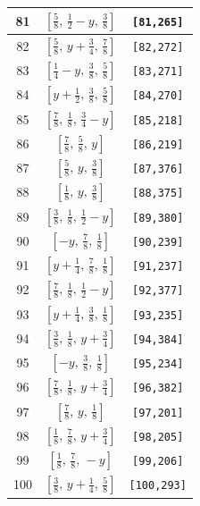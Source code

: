 \documentclass[fleqn,8pt]{jsarticle}
\begin{document}
\begin{longtable}{ccc}
81 & $\left[ \frac{5}{8},\, \frac{1}{2} - y,\, \frac{3}{8} \right]$ & {\tt [81,265]} \\ \hline
82 & $\left[ \frac{5}{8},\, y + \frac{3}{4},\, \frac{7}{8} \right]$ & {\tt [82,272]} \\ \hline
83 & $\left[ \frac{1}{4} - y,\, \frac{3}{8},\, \frac{5}{8} \right]$ & {\tt [83,271]} \\ \hline
84 & $\left[ y + \frac{1}{2},\, \frac{3}{8},\, \frac{5}{8} \right]$ & {\tt [84,270]} \\ \hline
85 & $\left[ \frac{7}{8},\, \frac{1}{8},\, \frac{3}{4} - y \right]$ & {\tt [85,218]} \\ \hline
86 & $\left[ \frac{7}{8},\, \frac{5}{8},\, y \right]$ & {\tt [86,219]} \\ \hline
87 & $\left[ \frac{5}{8},\, y,\, \frac{3}{8} \right]$ & {\tt [87,376]} \\ \hline
88 & $\left[ \frac{1}{8},\, y,\, \frac{3}{8} \right]$ & {\tt [88,375]} \\ \hline
89 & $\left[ \frac{3}{8},\, \frac{1}{8},\, \frac{1}{2} - y \right]$ & {\tt [89,380]} \\ \hline
90 & $\left[ - y,\, \frac{7}{8},\, \frac{1}{8} \right]$ & {\tt [90,239]} \\ \hline
91 & $\left[ y + \frac{1}{4},\, \frac{7}{8},\, \frac{1}{8} \right]$ & {\tt [91,237]} \\ \hline
92 & $\left[ \frac{7}{8},\, \frac{1}{8},\, \frac{1}{2} - y \right]$ & {\tt [92,377]} \\ \hline
93 & $\left[ y + \frac{1}{4},\, \frac{3}{8},\, \frac{1}{8} \right]$ & {\tt [93,235]} \\ \hline
94 & $\left[ \frac{3}{8},\, \frac{1}{8},\, y + \frac{3}{4} \right]$ & {\tt [94,384]} \\ \hline
95 & $\left[ - y,\, \frac{3}{8},\, \frac{1}{8} \right]$ & {\tt [95,234]} \\ \hline
96 & $\left[ \frac{7}{8},\, \frac{1}{8},\, y + \frac{3}{4} \right]$ & {\tt [96,382]} \\ \hline
97 & $\left[ \frac{7}{8},\, y,\, \frac{1}{8} \right]$ & {\tt [97,201]} \\ \hline
98 & $\left[ \frac{1}{8},\, \frac{7}{8},\, y + \frac{3}{4} \right]$ & {\tt [98,205]} \\ \hline
99 & $\left[ \frac{1}{8},\, \frac{7}{8},\, - y \right]$ & {\tt [99,206]} \\ \hline
100 & $\left[ \frac{3}{8},\, y + \frac{1}{4},\, \frac{5}{8} \right]$ & {\tt [100,293]} \\ \hline

\end{longtable}
\end{document}
